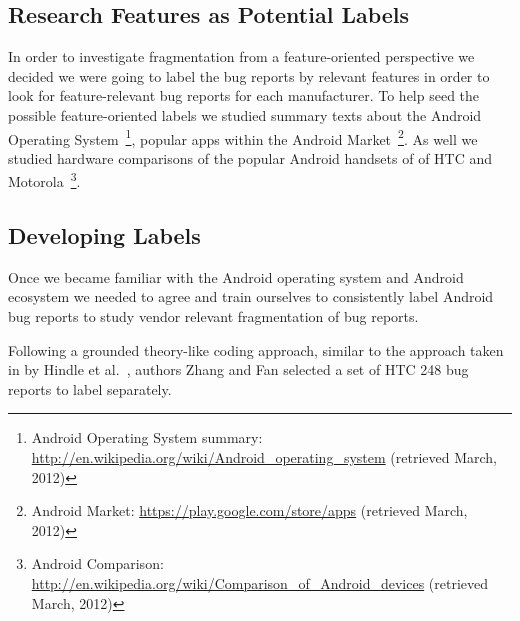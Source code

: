 \documentclass[10pt, conference, compsocconf]{IEEEtran}
\begin{document}
\subsection{Research Features as Potential Labels}


In order to investigate fragmentation from a feature-oriented
perspective we decided we were going to label the bug reports by
relevant features in order to look for feature-relevant bug reports
for each manufacturer.
To help seed the possible feature-oriented labels we 
studied summary texts about the Android Operating
System~\footnote{Android Operating System summary:
\url{http://en.wikipedia.org/wiki/Android_operating_system} (retrieved
March, 2012)}, 
popular apps within the Android Market~\footnote{Android Market:
  \url{https://play.google.com/store/apps} (retrieved March, 2012)}.
As well we studied hardware comparisons of the popular Android handsets of 
 of HTC and Motorola~\footnote{Android Comparison:
  \url{http://en.wikipedia.org/wiki/Comparison_of_Android_devices}
  (retrieved March, 2012)}.

\subsection{Developing Labels}


Once we became familiar with the Android operating system and Android
ecosystem we needed to agree and train ourselves to consistently label
Android bug reports to study vendor relevant fragmentation of bug reports.


Following a grounded theory-like coding approach, similar to the
approach taken in by Hindle et al.~\cite{Hindle2011}, authors Zhang
and Fan selected a set of HTC 248 bug reports to label
separately. 
\end{document}
